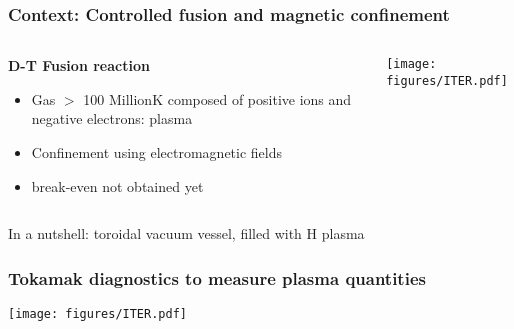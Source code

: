 \documentclass[10pt]{beamer}
\begin{document}
\begin{frame}
\frametitle{Context: Controlled fusion and magnetic confinement}

\begin{columns}
	\begin{column}{0.65\textwidth}
		\begin{center}
		\textbf{D-T Fusion reaction\;\;\;}\vspace{0.3cm}
		\resizebox{0.5\textwidth}{!}{}
		\end{center}
		\vspace{-0.5cm}
		\begin{itemize}%
			\item Gas $>$ 100 Million\degree K composed of positive ions and negative electrons: plasma
			\item Confinement using electromagnetic fields
			\item break-even not obtained yet
		\end{itemize}

	\end{column}

	\begin{column}{0.35\textwidth}
		\texttt{[image: figures/ITER.pdf]}
	\end{column}

\end{columns}

\begin{center}
In a nutshell: toroidal vacuum vessel, filled with H plasma
\end{center}%
\vspace{-0.2cm}
\end{frame}


\begin{frame}
\frametitle{Tokamak diagnostics to measure plasma quantities}
	\begin{center}
		\texttt{[image: figures/ITER.pdf]}
	\end{center}
\end{frame}
\end{document}
